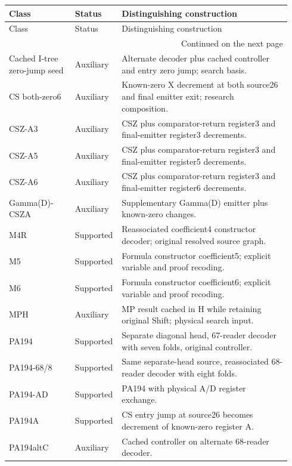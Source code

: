 {\small\renewcommand{\arraystretch}{1.12}
\begin{longtable}{@{}p{0.23\linewidth}p{0.12\linewidth}p{0.59\linewidth}@{}}
\toprule Class & Status & Distinguishing construction\\\midrule\endfirsthead
\toprule Class & Status & Distinguishing construction\\\midrule\endhead
\midrule\multicolumn{3}{r}{Continued on the next page}\\\endfoot
\bottomrule\endlastfoot
Cached I-tree zero-jump seed & Auxiliary & Alternate decoder plus cached controller and entry zero jump; search basis.\\[4pt]
CS both-zero6 & Auxiliary & Known-zero X decrement at both source26 and final emitter exit; research composition.\\[4pt]
CSZ-A3 & Auxiliary & CSZ plus comparator-return register3 and final-emitter register3 decrements.\\[4pt]
CSZ-A5 & Auxiliary & CSZ plus comparator-return register3 and final-emitter register5 decrements.\\[4pt]
CSZ-A6 & Auxiliary & CSZ plus comparator-return register3 and final-emitter register6 decrements.\\[4pt]
Gamma(D)-CSZA & Auxiliary & Supplementary Gamma(D) emitter plus known-zero changes.\\[4pt]
M4R & Supported & Reassociated coefficient4 constructor decoder; original resolved source graph.\\[4pt]
M5 & Supported & Formula constructor coefficient5; explicit variable and proof recoding.\\[4pt]
M6 & Supported & Formula constructor coefficient6; explicit variable and proof recoding.\\[4pt]
MPH & Auxiliary & MP result cached in H while retaining original Shift; physical search input.\\[4pt]
PA194 & Supported & Separate diagonal head, 67-reader decoder with seven folds, original controller.\\[4pt]
PA194-68/8 & Supported & Same separate-head source, reassociated 68-reader decoder with eight folds.\\[4pt]
PA194-AD & Supported & PA194 with physical A/D register exchange.\\[4pt]
PA194A & Supported & CS entry jump at source26 becomes decrement of known-zero register A.\\[4pt]
PA194altC & Auxiliary & Cached controller on alternate 68-reader decoder.\\[4pt]

\end{longtable}}
